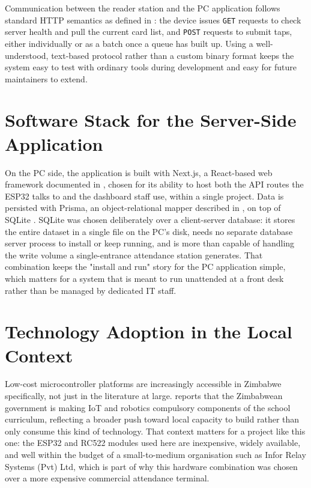 Communication between the reader station and the PC application follows standard HTTP semantics as defined in \textcite{fielding2014http}: the device issues \texttt{GET} requests to check server health and pull the current card list, and \texttt{POST} requests to submit taps, either individually or as a batch once a queue has built up. Using a well-understood, text-based protocol rather than a custom binary format keeps the system easy to test with ordinary tools during development and easy for future maintainers to extend.

\section{Software Stack for the Server-Side Application}

On the PC side, the application is built with Next.js, a React-based web framework documented in \textcite{vercel2026nextjs}, chosen for its ability to host both the API routes the ESP32 talks to and the dashboard staff use, within a single project. Data is persisted with Prisma, an object-relational mapper described in \textcite{prisma2026docs}, on top of SQLite \parencite{sqlite2026about}. SQLite was chosen deliberately over a client-server database: it stores the entire dataset in a single file on the PC's disk, needs no separate database server process to install or keep running, and is more than capable of handling the write volume a single-entrance attendance station generates. That combination keeps the "install and run" story for the PC application simple, which matters for a system that is meant to run unattended at a front desk rather than be managed by dedicated IT staff.

\section{Technology Adoption in the Local Context}

Low-cost microcontroller platforms are increasingly accessible in Zimbabwe specifically, not just in the literature at large. \textcite{techreviewafrica2026zimbabwe} reports that the Zimbabwean government is making IoT and robotics compulsory components of the school curriculum, reflecting a broader push toward local capacity to build rather than only consume this kind of technology. That context matters for a project like this one: the ESP32 and RC522 modules used here are inexpensive, widely available, and well within the budget of a small-to-medium organisation such as Infor Relay Systems (Pvt) Ltd, which is part of why this hardware combination was chosen over a more expensive commercial attendance terminal.

